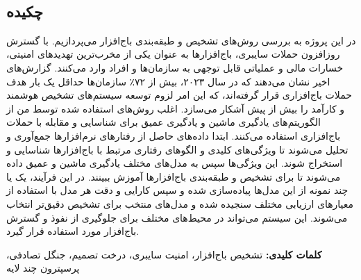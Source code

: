 
\setcounter{page}{1}
\thispagestyle{empty}

~\vfill

\subsection*{چکیده}
\begin{small}
\baselineskip=0.7cm
در این پروژه به بررسی روش‌های تشخیص و طبقه‌بندی باج‌افزار می‌پردازیم. با گسترش روزافزون حملات سایبری، باج‌افزارها به عنوان یکی از مخرب‌ترین تهدیدهای امنیتی، خسارات مالی و عملیاتی قابل توجهی به سازمان‌ها و افراد وارد می‌کنند. گزارش‌های اخیر نشان می‌دهند که در سال ۲۰۲۳، بیش از ۷۲٪ سازمان‌ها حداقل یک بار هدف حملات باج‌افزاری قرار گرفته‌اند، که این امر لزوم توسعه سیستم‌های تشخیص هوشمند و کارآمد را بیش از پیش آشکار می‌سازد. اغلب روش‌های استفاده شده توسط من از الگوریتم‌های یادگیری ماشین و یادگیری عمیق برای شناسایی و مقابله با حملات باج‌افزاری استفاده می‌کنند. ابتدا داده‌های حاصل از رفتارهای نرم‌افزارها جمع‌آوری و تحلیل می‌شوند تا ویژگی‌های کلیدی و الگوهای رفتاری مرتبط با باج‌افزارها شناسایی و استخراج شوند. این ویژگی‌ها سپس به مدل‌های مختلف یادگیری ماشین و عمیق داده می‌شوند تا برای تشخیص و طبقه‌بندی باج‌افزارها آموزش ببینند. در این فرآیند، یک یا چند نمونه از این مدل‌ها پیاده‌سازی شده و سپس کارایی و دقت هر مدل با استفاده از معیارهای ارزیابی مختلف سنجیده شده و مدل‌های منتخب برای تشخیص دقیق‌تر انتخاب می‌شوند. این سیستم می‌تواند در محیط‌های مختلف برای جلوگیری از نفوذ و گسترش باج‌افزار مورد استفاده قرار گیرد.

\noindent\textbf{کلمات کلیدی:} تشخیص باج‌افزار، امنیت سایبری، درخت تصمیم، جنگل تصادفی، پرسپترون چند لایه
\end{small}